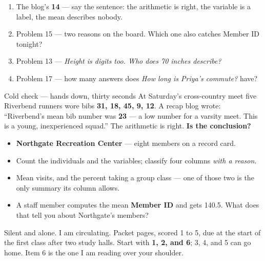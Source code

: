 \documentclass[aspectratio=169, 11pt]{beamer}
\begin{document}
\begin{frame}[t, plain]
  \vspace{4pt}
  \begin{enumerate}\setlength{\itemsep}{4pt}
    \item The blog's \textbf{14} --- say the sentence: the arithmetic is right, the variable
          is a label, the mean describes nobody.
    \item Problem 15 --- two reasons on the board. Which one also catches Member ID tonight?
    \item Problem 13 --- \emph{Height is digits too. Who does 70 inches describe?}
    \item Problem 17 --- how many answers does \emph{How long is Priya's commute?} have?
  \end{enumerate}
  \vspace{4pt}
  \begin{block}{Cold check --- hands down, thirty seconds}
    At Saturday's cross-country meet five Riverbend runners wore bibs \textbf{31, 18, 45, 9,
    12}. A recap blog wrote: ``Riverbend's mean bib number was \textbf{23} --- a low number
    for a varsity meet. This is a young, inexperienced squad.'' The arithmetic is right.
    \textbf{Is the conclusion?}
  \end{block}
\end{frame}

\begin{frame}[t, plain]
  \begin{itemize}\setlength{\itemsep}{5pt}
    \item \textbf{Northgate Recreation Center} --- eight members on a record card.
    \item Count the individuals and the variables; classify four columns \emph{with a reason}.
    \item Mean visits, and the percent taking a group class --- one of those two is the only
          summary its column allows.
    \item A staff member computes the mean \textbf{Member ID} and gets 140.5. What does that
          tell you about Northgate's members?
  \end{itemize}
  \begin{block}{Silent and alone. I am circulating. Packet pages, scored 1 to 5, due at the start of the first class after two study halls.}
    Start with \textbf{1, 2, and 6}; 3, 4, and 5 can go home. Item 6 is the one I am reading
    over your shoulder.
  \end{block}
\end{frame}
\end{document}
